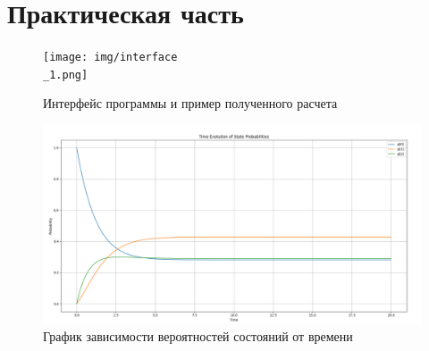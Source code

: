 \chapter{Практическая часть}

\begin{figure}[ht!]
	\centering
	\texttt{[image: img/interface\\\_1.png]}
	\caption{Интерфейс программы и пример полученного расчета}
	\label{ex:int}
\end{figure}

\begin{figure}[ht!]
	\centering
	\includegraphics[width=0.8\linewidth]{img/graph_1.png}
	\caption{График зависимости вероятностей состояний от времени}
	\label{ex:res}
\end{figure}
